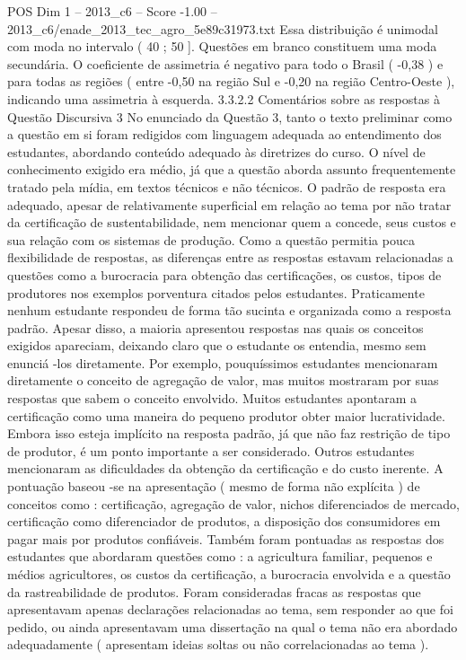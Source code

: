 \begin{textsample}{POS Dim 1 – 2013\_c6 – Score -1.00 – 2013\_c6/enade\_2013\_tec\_agro\_5e89c31973.txt}
Essa distribuição é unimodal com moda no intervalo ( 40 ; 50 ].
Questões em branco constituem uma moda secundária.
O coeficiente de assimetria é negativo para todo o Brasil ( -0,38 ) e para todas as regiões ( entre -0,50 na região Sul e -0,20 na região Centro-Oeste ), indicando uma assimetria à esquerda. 3.3.2.2 Comentários sobre as respostas à Questão Discursiva 3 No enunciado da Questão 3, tanto o texto preliminar como a questão em si foram redigidos com linguagem adequada ao entendimento dos estudantes, abordando conteúdo adequado às diretrizes do curso.
O nível de conhecimento exigido era médio, já que a questão aborda assunto frequentemente tratado pela mídia, em textos técnicos e não técnicos.
O padrão de resposta era adequado, apesar de relativamente superficial em relação ao tema por não tratar da certificação de sustentabilidade, nem mencionar quem a concede, seus custos e sua relação com os sistemas de produção.
Como a questão permitia pouca flexibilidade de respostas, as diferenças entre as respostas estavam relacionadas a questões como a burocracia para obtenção das certificações, os custos, tipos de produtores nos exemplos porventura citados pelos estudantes.
Praticamente nenhum estudante respondeu de forma tão sucinta e organizada como a resposta padrão.
Apesar disso, a maioria apresentou respostas nas quais os conceitos exigidos apareciam, deixando claro que o estudante os entendia, mesmo sem enunciá -los diretamente.
Por exemplo, pouquíssimos estudantes mencionaram diretamente o conceito de agregação de valor, mas muitos mostraram por suas respostas que sabem o conceito envolvido.
Muitos estudantes apontaram a certificação como uma maneira do pequeno produtor obter maior lucratividade.
Embora isso esteja implícito na resposta padrão, já que não faz restrição de tipo de produtor, é um ponto importante a ser considerado.
Outros estudantes mencionaram as dificuldades da obtenção da certificação e do custo inerente.
A pontuação baseou -se na apresentação ( mesmo de forma não explícita ) de conceitos como : certificação, agregação de valor, nichos diferenciados de mercado, certificação como diferenciador de produtos, a disposição dos consumidores em pagar mais por produtos confiáveis.
Também foram pontuadas as respostas dos estudantes que abordaram questões como : a agricultura familiar, pequenos e médios agricultores, os custos da certificação, a burocracia envolvida e a questão da rastreabilidade de produtos.
Foram consideradas fracas as respostas que apresentavam apenas declarações relacionadas ao tema, sem responder ao que foi pedido, ou ainda apresentavam uma dissertação na qual o tema não era abordado adequadamente ( apresentam ideias soltas ou não correlacionadas ao tema ).

\end{textsample}
